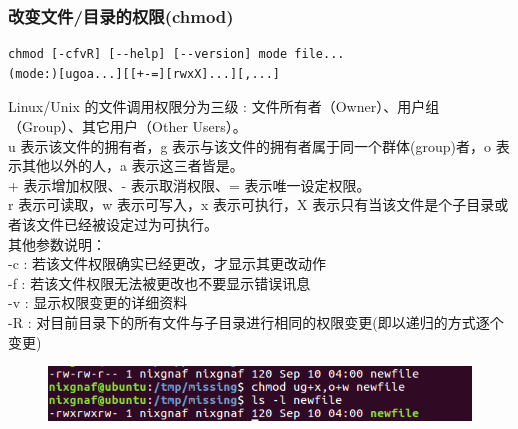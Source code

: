 \documentclass{article}
\begin{document}
\subsubsection{改变文件/目录的权限(chmod)}
\begin{lstlisting}[style=myStyle]
chmod [-cfvR] [--help] [--version] mode file...
(mode:)[ugoa...][[+-=][rwxX]...][,...]
\end{lstlisting}
Linux/Unix 的文件调用权限分为三级 : 文件所有者（Owner）、用户组（Group）、其它用户（Other Users）。\\
u 表示该文件的拥有者，g 表示与该文件的拥有者属于同一个群体(group)者，o 表示其他以外的人，a 表示这三者皆是。\\
+ 表示增加权限、- 表示取消权限、= 表示唯一设定权限。\\
r 表示可读取，w 表示可写入，x 表示可执行，X 表示只有当该文件是个子目录或者该文件已经被设定过为可执行。\\
其他参数说明：\\
-c : 若该文件权限确实已经更改，才显示其更改动作\\
-f : 若该文件权限无法被更改也不要显示错误讯息\\
-v : 显示权限变更的详细资料\\
-R : 对目前目录下的所有文件与子目录进行相同的权限变更(即以递归的方式逐个变更)\\
\begin{figure}[h]
    \centering
    \includegraphics[width=0.5\linewidth]{image21.png}
\end{figure}
\end{document}
